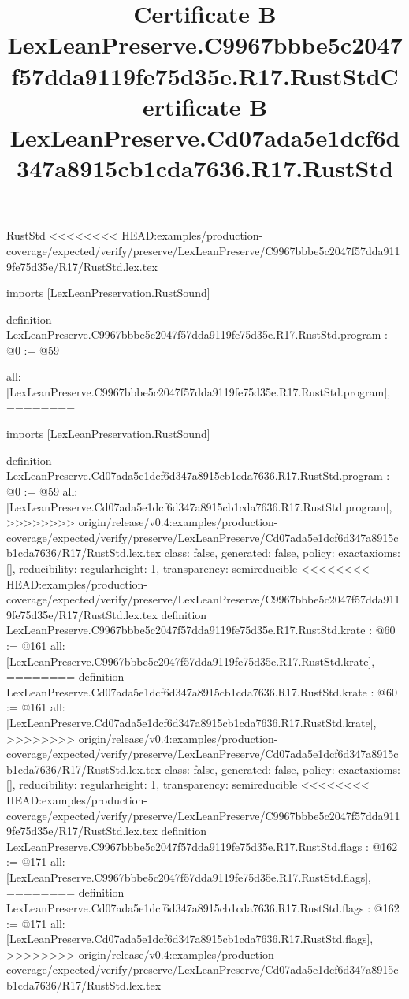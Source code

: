 \begin{lexlean}{RustStd}
<<<<<<<< HEAD:examples/production-coverage/expected/verify/preserve/LexLeanPreserve/C9967bbbe5c2047f57dda9119fe75d35e/R17/RustStd.lex.tex
\title{Certificate B LexLeanPreserve.C9967bbbe5c2047f57dda9119fe75d35e.R17.RustStd}
\begin{coremodule}
imports [LexLeanPreservation.RustSound]

definition LexLeanPreserve.C9967bbbe5c2047f57dda9119fe75d35e.R17.RustStd.program : @0 := @59 {
  all: [LexLeanPreserve.C9967bbbe5c2047f57dda9119fe75d35e.R17.RustStd.program],
========
\title{Certificate B LexLeanPreserve.Cd07ada5e1dcf6d347a8915cb1cda7636.R17.RustStd}
\begin{coremodule}
imports [LexLeanPreservation.RustSound]

definition LexLeanPreserve.Cd07ada5e1dcf6d347a8915cb1cda7636.R17.RustStd.program : @0 := @59 {
  all: [LexLeanPreserve.Cd07ada5e1dcf6d347a8915cb1cda7636.R17.RustStd.program],
>>>>>>>> origin/release/v0.4:examples/production-coverage/expected/verify/preserve/LexLeanPreserve/Cd07ada5e1dcf6d347a8915cb1cda7636/R17/RustStd.lex.tex
  class: false,
  generated: false,
  policy: exact{axioms: []},
  reducibility: regular{height: 1},
  transparency: semireducible
}
<<<<<<<< HEAD:examples/production-coverage/expected/verify/preserve/LexLeanPreserve/C9967bbbe5c2047f57dda9119fe75d35e/R17/RustStd.lex.tex
definition LexLeanPreserve.C9967bbbe5c2047f57dda9119fe75d35e.R17.RustStd.krate : @60 := @161 {
  all: [LexLeanPreserve.C9967bbbe5c2047f57dda9119fe75d35e.R17.RustStd.krate],
========
definition LexLeanPreserve.Cd07ada5e1dcf6d347a8915cb1cda7636.R17.RustStd.krate : @60 := @161 {
  all: [LexLeanPreserve.Cd07ada5e1dcf6d347a8915cb1cda7636.R17.RustStd.krate],
>>>>>>>> origin/release/v0.4:examples/production-coverage/expected/verify/preserve/LexLeanPreserve/Cd07ada5e1dcf6d347a8915cb1cda7636/R17/RustStd.lex.tex
  class: false,
  generated: false,
  policy: exact{axioms: []},
  reducibility: regular{height: 1},
  transparency: semireducible
}
<<<<<<<< HEAD:examples/production-coverage/expected/verify/preserve/LexLeanPreserve/C9967bbbe5c2047f57dda9119fe75d35e/R17/RustStd.lex.tex
definition LexLeanPreserve.C9967bbbe5c2047f57dda9119fe75d35e.R17.RustStd.flags : @162 := @171 {
  all: [LexLeanPreserve.C9967bbbe5c2047f57dda9119fe75d35e.R17.RustStd.flags],
========
definition LexLeanPreserve.Cd07ada5e1dcf6d347a8915cb1cda7636.R17.RustStd.flags : @162 := @171 {
  all: [LexLeanPreserve.Cd07ada5e1dcf6d347a8915cb1cda7636.R17.RustStd.flags],
>>>>>>>> origin/release/v0.4:examples/production-coverage/expected/verify/preserve/LexLeanPreserve/Cd07ada5e1dcf6d347a8915cb1cda7636/R17/RustStd.lex.tex
}}}
\end{coremodule}}
\end{coremodule}
\end{lexlean}
